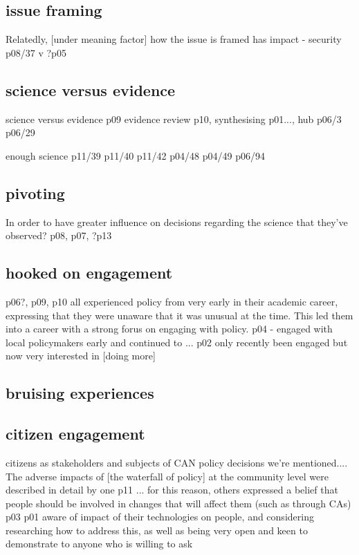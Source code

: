 \subsection{issue framing}
Relatedly, [under meaning factor] how the issue is framed has impact - security p08/37 v ?p05

\subsection{science versus evidence}
science versus evidence p09
evidence review p10, synthesising p01..., hub p06/3 p06/29

enough science p11/39 p11/40 p11/42 p04/48 p04/49 p06/94


\subsection{pivoting}
In order to have greater influence on decisions regarding the science that they've observed?
p08, p07, ?p13

\subsection{hooked on engagement}
p06?, p09, p10 all experienced policy from very early in their academic career, expressing that they were unaware that it was unusual at the time. This led them into a career with a strong forus on engaging with policy. p04 - engaged with local policymakers early and continued to ... p02 only recently been engaged but now very interested in [doing more]

\subsection{bruising experiences}


\subsection{citizen engagement}
citizens as stakeholders and subjects of CAN policy decisions we're mentioned.... The adverse impacts of [the waterfall of policy] at the community level were described in detail by one p11 ... for this reason, others expressed a belief that people should be involved in changes that will affect them (such as through CAs) p03  p01 aware of impact of their technologies on people, and considering researching how to address this, as well as being very open and keen to demonstrate to anyone who is willing to ask


